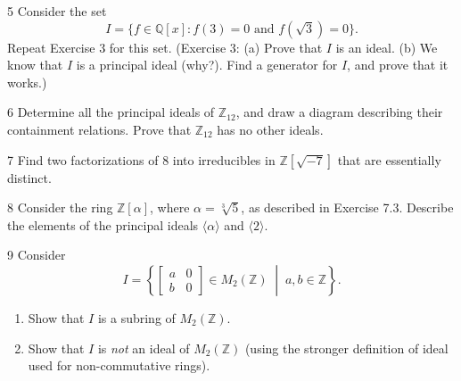 \begin{problem}{5}
    Consider the set
    \[I = \{f \in \mathbb{Q}[x] : f(3) = 0 \text{ and } f(\sqrt{3}) = 0\}.\]
    Repeat Exercise 3 for this set. (Exercise 3: (a) Prove that $I$ is an ideal.
    (b) We know that $I$ is a principal ideal (why?). Find a generator for $I$, and prove
    that it works.)
\end{problem}
\unsolved

\begin{problem}{6}
    Determine all the principal ideals of $\mathbb{Z}_{12}$, and draw a diagram describing
    their containment relations. Prove that $\mathbb{Z}_{12}$ has no other ideals.
\end{problem}
\unsolved

\begin{problem}{7}
    Find two factorizations of 8 into irreducibles in $\mathbb{Z}[\sqrt{-7}]$ that are
    essentially distinct.
\end{problem}
\unsolved

\begin{problem}{8}
    Consider the ring $\mathbb{Z}[\alpha]$, where $\alpha = \sqrt[3]{5}$, as described in
    Exercise 7.3. Describe the elements of the principal ideals $\langle \alpha \rangle$
    and $\langle 2 \rangle$.
\end{problem}
\unsolved

\begin{problem}{9}
    Consider 
    \[
    I = \left\{
    \begin{bmatrix}
        a & 0 \\[2mm] 
        b & 0
    \end{bmatrix} \in M_2(\mathbb{Z}) \;\middle|\; a, b \in \mathbb{Z} 
    \right\}.
    \]
    \begin{enumerate}
        \item Show that $I$ is a subring of $M_2(\mathbb{Z})$.
        \item Show that $I$ is \emph{not} an ideal of $M_2(\mathbb{Z})$ (using the stronger 
                definition of ideal used for non-commutative rings).
    \end{enumerate}
\end{problem}
\solved


